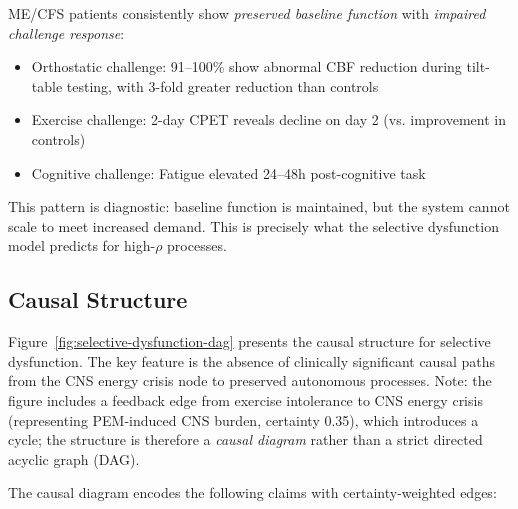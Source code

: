 \begin{observation}
\label{obs:demand-response}
ME/CFS patients consistently show \emph{preserved baseline function} with \emph{impaired challenge response}:
\begin{itemize}
    \item Orthostatic challenge: 91--100\% show abnormal CBF reduction during tilt-table testing, with 3-fold greater reduction than controls~\cite{VanCampenEtAl2020}
    \item Exercise challenge: 2-day CPET reveals decline on day 2 (vs. improvement in controls)~\cite{keller2024cpet}
    \item Cognitive challenge: Fatigue elevated 24--48h post-cognitive task~\cite{VanCampen2023PEM}
\end{itemize}

This pattern is diagnostic: baseline function is maintained, but the system cannot scale to meet increased demand. This is precisely what the selective dysfunction model predicts for high-$\rho$ processes.
\end{observation}


\subsection{Causal Structure}

Figure~\ref{fig:selective-dysfunction-dag} presents the causal structure for selective dysfunction. The key feature is the absence of clinically significant causal paths from the CNS energy crisis node to preserved autonomous processes. Note: the figure includes a feedback edge from exercise intolerance to CNS energy crisis (representing PEM-induced CNS burden, certainty 0.35), which introduces a cycle; the structure is therefore a \emph{causal diagram} rather than a strict directed acyclic graph (DAG).



The causal diagram encodes the following claims with certainty-weighted edges:

